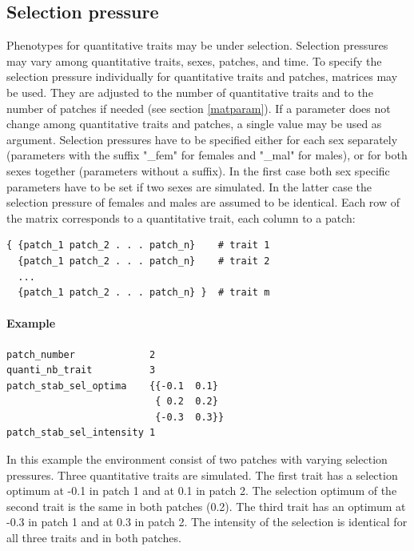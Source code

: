 \documentclass[letterpaper,12pt,oneside]{book}
\begin{document}
\begin{appendices}
\section{Selection pressure}\label{selPressure}
Phenotypes for quantitative traits  may be under selection. Selection pressures may vary among quantitative traits, sexes, patches, and time. To specify the selection pressure individually for quantitative traits and patches, matrices may be used. They are adjusted to the number of quantitative traits and to the number of patches if needed (see section \ref{matparam}). If a parameter does not change among quantitative traits and patches, a single value may be used as argument. Selection pressures have to be specified either for each sex separately (parameters with the suffix "\_fem" for females and "\_mal" for males), or for both sexes together (parameters without a suffix). In the first case both sex specific parameters have to be set if two sexes are simulated. In the latter case the selection pressure of females and males are assumed to be identical. Each row of the matrix corresponds to a quantitative trait, each column to a patch:
\begin{lstlisting}[frame=single]
{ {patch_1 patch_2 . . . patch_n}    # trait 1
  {patch_1 patch_2 . . . patch_n}    # trait 2
  ...
  {patch_1 patch_2 . . . patch_n} }  # trait m
\end{lstlisting}

\paragraph{Example}\hspace*{\fill}
\begin{lstlisting}[frame=single]
patch_number             2
quanti_nb_trait          3
patch_stab_sel_optima    {{-0.1  0.1}							
                          { 0.2  0.2}
                          {-0.3  0.3}}	
patch_stab_sel_intensity 1													
\end{lstlisting}
In this example the environment consist of two patches with varying selection pressures. Three quantitative traits are simulated. The first trait has a selection optimum at -0.1 in patch 1 and at 0.1 in patch 2. The selection optimum of the second trait is the same in both patches (0.2). The third trait has an optimum at -0.3 in patch 1 and at 0.3 in patch 2. The intensity of the selection is identical for all three traits and in both patches.    



\end{appendices}
\end{document}
